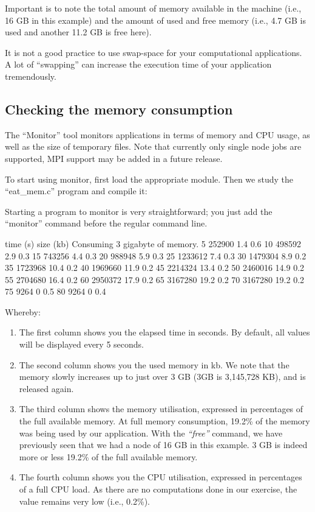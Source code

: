 Important is to note the total amount of memory available in the machine (i.e.,
16 GB in this example) and the amount of used and free memory (i.e., 4.7 GB is
used and another 11.2 GB is free here).

It is not a good practice to use swap-space for your computational
applications. A lot of ``swapping'' can increase the execution time of your
application tremendously.

\subsection{Checking the memory consumption}

\ifgent
\else
The ``Monitor'' tool monitors applications in terms of memory and CPU usage, as
well as the size of temporary files. Note that currently only single node jobs
are supported, MPI support may be added in a future release.

To start using monitor, first load the appropriate module. Then we study the
``eat\_mem.c'' program and compile it:

\begin{prompt}
\end{prompt}


Starting a program to monitor is very straightforward; you just add the
``monitor'' command before the regular command line.

\begin{prompt}
time (s) size (kb) %
Consuming 3 gigabyte of memory.
5  252900 1.4 0.6
10  498592 2.9 0.3
15  743256 4.4 0.3
20  988948 5.9 0.3
25  1233612 7.4 0.3
30  1479304 8.9 0.2
35  1723968 10.4 0.2
40  1969660 11.9 0.2
45  2214324 13.4 0.2
50  2460016 14.9 0.2
55  2704680 16.4 0.2
60  2950372 17.9 0.2
65  3167280 19.2 0.2
70  3167280 19.2 0.2
75  9264  0 0.5
80  9264  0 0.4
\end{prompt}

Whereby:

\begin{enumerate}
\item  The first column shows you the elapsed time in seconds. By default, all
  values will be displayed every 5 seconds.
\item  The second column shows you the used memory in kb. We note that the
  memory slowly increases up to just over 3 GB (3GB is 3,145,728 KB), and is released again.
\item  The third column shows the memory utilisation, expressed in percentages
  of the full available memory.  At full memory consumption, 19.2\% of the
  memory was being used by our application. With the \emph{``free''} command,
  we have previously seen that we had a node of 16 GB in this example. 3 GB is
  indeed more or less 19.2\% of the full available memory.
\item  The fourth column shows you the CPU utilisation, expressed in
  percentages of a full CPU load. As there are no computations done in our
  exercise, the value remains very low (i.e., 0.2\%).
\end{enumerate}

